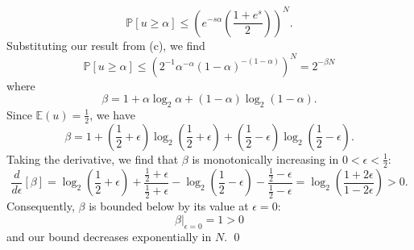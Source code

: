\documentclass{amsart}
\begin{document}
\begin{solution}
\begin{enumerate}
      \begin{equation*}
        \mathbb{P}\left[u \geq \alpha\right]
          \leq \left(e^{-s\alpha} \left(\frac{1 + e^s}{2}\right)\right)^N.
      \end{equation*}
      Substituting our result from (c), we find
      \begin{equation*}
        \mathbb{P}\left[u \geq \alpha\right] \leq
          \left(2^{-1} \alpha^{-\alpha} (1-\alpha)^{-(1-\alpha)}\right)^N =
            2^{-\beta N}
      \end{equation*}
      where
      \begin{equation*}
        \beta = 1 + \alpha \log_2 \alpha + (1 - \alpha)\log_2 (1 - \alpha).
      \end{equation*}
      Since \(\mathbb{E}(u) = \frac{1}{2}\), we have
      \begin{equation*}
        \beta = 1 + \left(\frac{1}{2} + \epsilon\right)
          \log_2 \left(\frac{1}{2} + \epsilon\right) +
          \left(\frac{1}{2} - \epsilon\right)
          \log_2 \left(\frac{1}{2} - \epsilon\right).
      \end{equation*}
      Taking the derivative, we find that \(\beta\) is monotonically increasing
      in \(0 < \epsilon < \frac{1}{2}\):
      \begin{equation*}
        \frac{d}{d\epsilon}\left[\beta\right] =
          \log_2 \left(\frac{1}{2} + \epsilon\right) +
          \frac{\frac{1}{2} + \epsilon}{\frac{1}{2} + \epsilon} -
          \log_2 \left(\frac{1}{2} - \epsilon\right) -
          \frac{\frac{1}{2} - \epsilon}{\frac{1}{2} - \epsilon}
          = \log_2 \left(\frac{1 + 2\epsilon}{1 - 2\epsilon}\right) > 0.
      \end{equation*}
      Consequently, \(\beta\) is bounded below by its value at \(\epsilon = 0\):
      \begin{equation*}
        \beta \big|_{\epsilon = 0} = 1 > 0
      \end{equation*}
      and our bound decreases exponentially in \(N\). \qed
  \end{enumerate}
\end{solution}
\end{document}
